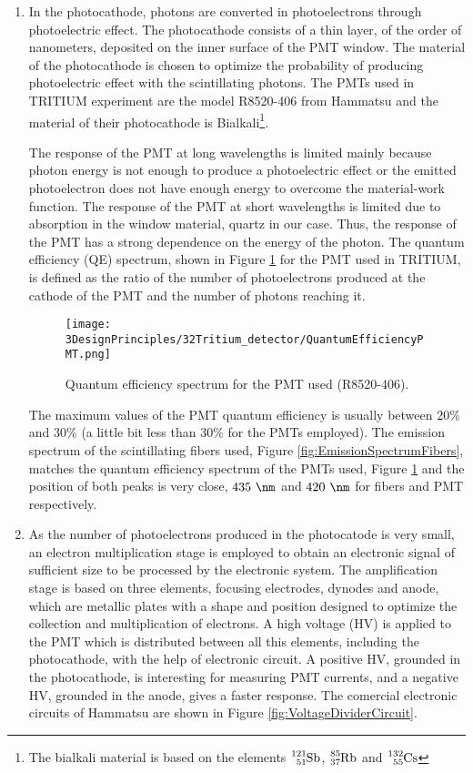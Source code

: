 \begin{enumerate}
\item{} In the photocathode, photons are converted in photoelectrons through photoelectric effect. The photocathode consists of a thin layer, of the order of nanometers, deposited on the inner surface of the PMT window. The material of the photocathode is chosen to optimize the probability of producing photoelectric effect with the scintillating photons. The PMTs used in TRITIUM experiment are the model R8520-406 from Hammatsu \cite{DataSheetPMTs} and the material of their photocathode is Bialkali\footnote{The bialkali material is based on the elements $\ce{^{121}_{51}Sb}$, $\ce{^{85}_{37}Rb}$ and $\ce{^{132}_{55}Cs}$}.

The response of the PMT at long wavelengths is limited mainly because photon energy is not enough to produce a photoelectric effect or the emitted photoelectron does not have enough energy to overcome the material-work function. The response of the PMT at short wavelengths is limited due to absorption in the window material, quartz in our case. Thus, the response of the PMT has a strong dependence on the energy of the photon. The quantum efficiency (QE)  spectrum, shown in Figure \ref{fig:QuantumEfficiencyPMT} for the PMT used in TRITIUM, is defined as the ratio of the number of photoelectrons produced at the cathode of the PMT and the number of photons reaching it.

\begin{figure}[htbp]
\centering
\texttt{[image: 3DesignPrinciples/32Tritium\_detector/QuantumEfficiencyPMT.png]}
\caption{Quantum efficiency spectrum for the PMT used (R8520-406).\label{fig:QuantumEfficiencyPMT}~\cite{DataSheetPMTs}}
\end{figure}

The maximum values of the PMT quantum efficiency is usually between $20\%$ and $30\%$ \cite{Knoll} (a little bit less than $30\%$ for the PMTs employed). The emission spectrum of the scintillating fibers used, Figure \ref{fig:EmissionSpectrumFibers}, matches the quantum efficiency spectrum of the PMTs used, Figure \ref{fig:QuantumEfficiencyPMT} and the position of both peaks is very close, $435~\nm$ and $420~\nm$ for fibers and PMT respectively.

\item{} As the number of photoelectrons produced in the photocatode is very small, an electron multiplication stage is employed to obtain an electronic signal of sufficient size to be processed by the electronic system. The amplification stage is based on three elements, focusing electrodes, dynodes and anode, which are metallic plates with a shape and position designed to optimize the collection and multiplication of electrons. A high voltage (HV) is applied to the PMT which is distributed between all this elements, including the photocathode, with the help of electronic circuit. A positive HV, grounded in the photocathode, is interesting for measuring PMT currents, and a negative HV, grounded in the anode, gives a faster response. The comercial electronic circuits of Hammatsu are shown in Figure \ref{fig:VoltageDividerCircuit}.


\end{enumerate}
